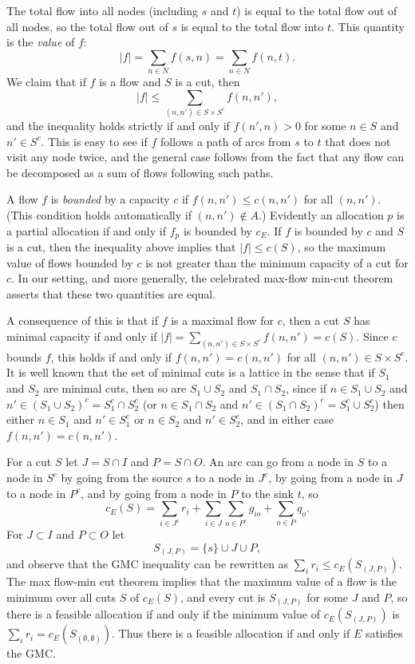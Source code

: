 \documentclass[12pt]{article}
\theoremstyle{definition}
\begin{document}
The total flow into all nodes (including $s$ and $t$) is equal to the total flow out of all nodes, so the total flow out of $s$ is equal to the total flow into $t$.
This quantity is the \emph{value} of $f$:
$$|f| = \sum_{n \in N} f(s,n) = \sum_{n \in N} f(n,t).$$ 
We claim that if $f$ is a flow and $S$ is a cut, then $$|f| \le \sum_{(n,n') \in S \times S^c} f(n,n'),$$ and the inequality holds strictly if and only if $f(n',n) > 0$ for some $n \in S$ and $n' \in S^c$.
This is easy to see if  $f$ follows a path of arcs from $s$ to $t$ that does not visit any node twice, and the general case follows from the fact that any flow can be decomposed as a sum of flows following such paths.

A flow $f$ is \emph{bounded} by a capacity $c$ if $f(n,n') \le c(n,n')$ for all $(n,n')$.  (This condition holds automatically if $(n,n') \notin A$.) Evidently an allocation $p$ is a partial allocation if and only if $f_p$ is bounded by $c_E$.  If $f$ is bounded by $c$ and $S$ is a cut, then the inequality above implies that $|f| \le c(S)$, so the maximum value of flows bounded by $c$ is not greater than the minimum capacity of a cut for $c$.  In our setting, and more generally, the celebrated max-flow min-cut theorem \citep{FoFu56} asserts that these two quantities are equal. 
  
A consequence of this is that if $f$ is a maximal flow for $c$, then a cut $S$ has minimal capacity if and only if $|f| = \sum_{(n,n') \in S \times S^c} f(n,n') = c(S)$.  Since $c$ bounds $f$, this holds if and only if $f(n,n') = c(n,n')$ for all $(n,n') \in S \times S^c$.  
It is well known \citep{FoFu56,Sha61,Ore62} that the set of minimal cuts is a lattice in the sense that if $S_1$ and $S_2$ are minimal cuts, then so are $S_1 \cup S_2$ and $S_1 \cap S_2$, since
if $n \in S_1 \cup S_2$ and $n' \in (S_1 \cup S_2)^c = S_1^c \cap S_2^c$ 
(or $n \in S_1 \cap S_2$ and $n' \in (S_1 \cap S_2)^c = S_1^c \cup S_2^c$) 
then either $n \in S_1$ and $n' \in S_1^c$ or $n \in S_2$ and $n' \in S_2^c$, and in either case $f(n,n') = c(n,n')$.

For a cut $S$ let $J = S \cap I$ and $P = S \cap O$.  An arc can go from a node in $S$ to a node in $S^c$ by going from the source $s$ to a node in $J^c$, by going from a node in $J$ to a node in $P^c$, and by going from a node in $P$ to the sink $t$, so
$$c_E(S) = \sum_{i \in J^c} r_i + \sum_{i \in J} \sum_{o \in P^c} g_{io} + \sum_{o \in P} q_o.$$
For $J \subset I$ and $P \subset O$ let
$$S_{(J,P)} = \{s\} \cup J \cup P,$$ and observe that  the GMC inequality can be rewritten as $\sum_i r_i \le c_E(S_{(J,P)})$.  The max flow-min cut theorem implies that the maximum value of a flow is the minimum over all cuts $S$ of $c_E(S)$, and every cut is $S_{(J,P)}$ for some $J$ and $P$, so there is a feasible allocation if and only if the minimum value of $c_E(S_{(J,P)})$ is $\sum_i r_i = c_E(S_{(\emptyset,\emptyset)})$.  Thus there is a feasible allocation if and only if $E$ satisfies the GMC.
\end{document}
